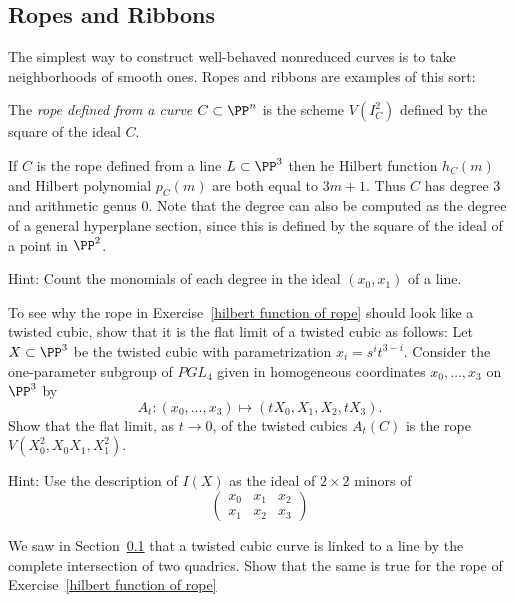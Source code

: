 \subsection{Ropes and Ribbons}
The simplest way to construct well-behaved nonreduced curves is
to take neighborhoods of smooth ones. Ropes and ribbons are examples of this sort:

\begin{definition}
The \emph{rope defined from a curve $C \subset \PP^n$} is the scheme $V(I^2_C)$ defined by the square of the ideal $C$.
\end{definition}

\begin{exercise}\label{hilbert function of rope}
If $C$ is the rope defined from a line $L\subset \PP^3$ then he Hilbert function $h_C(m)$ and Hilbert polynomial $p_C(m)$ are both equal to $3m+1$. Thus $C$ has degree 3 and
arithmetic genus 0. Note that the degree can also be computed as the degree of 
a general hyperplane section, since this is defined by the square of the ideal of a point
in $\PP^2$.

Hint: Count the monomials of each degree in the ideal $(x_0,x_1)$ of a line. 
\end{exercise}

\begin{exercise} To see why the rope in Exercise~\ref{hilbert function of rope} should look like a twisted cubic, show that it is the flat limit of a twisted cubic as follows:
 Let $X \subset \PP^3$ be the twisted cubic with parametrization $x_i = s^it^{3-i}$. Consider the one-parameter subgroup of $PGL_4$ given in homogeneous coordinates $x_0,\dots, x_3$ on $\PP^3$ by
$$
A_t : (x_0,\dots,x_3) \mapsto (tX_0, X_1, X_2,tX_3).
$$
Show that the flat limit, as $t\to 0$, of the twisted cubics $A_t(C)$ is the rope $V(X_0^2, X_0X_1,X_1^2)$.

Hint: Use the description of $I(X)$ as the ideal of $2\times 2$ minors of
$$
\begin{pmatrix}
 x_0 &x_1&x_2\\
x_1& x_2& x_3
\end{pmatrix}
$$
\end{exercise}
 
 
\begin{exercise}
We saw in Section~\ref{} that a twisted cubic curve is linked to a line by the complete intersection
 of two quadrics. Show that the same is true for the rope of Exercise~\ref{hilbert function of rope} 
\end{exercise}
 
